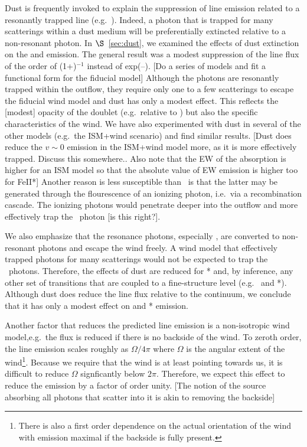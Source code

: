 \documentclass[12pt,preprint]{aastex}
\begin{document}
Dust is frequently invoked to explain the suppression of line emission
related to a resonantly trapped line (e.g.\ \lya).  Indeed, a photon
that is trapped for many scatterings within a dust medium will be
preferentially extincted relative to a non-resonant photon.  In
$\S$~\ref{sec:dust}, we examined the effects of dust extinction on the
 and  emission.  The general result was a modest
suppression of the line flux of the order of (1+\taud)$^{-1}$ instead of
exp(--\taud).   [Do a series of models and fit a functional form for
the fiducial model]  Although the  photons are resonantly
trapped within the outflow, they require only one to a few scatterings
to escape the fiducial wind model and dust has only a
modest effect.  This reflects the [modest] opacity of the 
doublet (e.g.\ relative to \lya) but also the specific characteristics
of the wind.  We have also experimented with dust in several of the
other models (e.g.\ the ISM+wind scenario) and find similar results.
[Dust does reduce the $v \sim 0$ emission in the ISM+wind model more,
as it is more effectively trapped.  Discuss this somewhere..  Also
note that the EW of the absorption is higher for an ISM model so that
the absolute value of EW emission is higher too for FeII*]
Another reason  is less susceptible than \lya\ is that the
latter may be generated through the flourescence of an ionizing
photon, i.e.\ via a recombination cascade.  The ionizing photons 
would penetrate deeper into the outflow and more effectively trap the
\lya\ photon [is this right?].  

We also emphasize that the  resonance photons, especially
\feiia, are converted to non-resonant photons and escape the wind
freely.  A wind model that effectively trapped 
photons for many scatterings would not be expected to trap the
\feiid\ photons.  Therefore, the effects of dust are 
reduced for * and, by inference, any other set of
transitions that are coupled to a fine-structure level (e.g.\
 and *).  
Although dust does reduce the line flux relative to the continuum, we
conclude that it has only a modest effect on \ion{Mg}{2} and
* emission.    

Another factor that reduces the predicted line emission is a
non-isotropic wind model,e.g.\ the flux is reduced if there is no
backside of the wind.  To zeroth order, the line emission scales
roughly as $\Omega/4\pi$ where $\Omega$ is the angular extent of the
wind\footnote{There is also a first order dependence on the actual
  orientation of the wind with emission maximal if the backside is
  fully present.}.  Because we require that the wind is at least
pointing towards us, it is difficult to reduce $\Omega$ signficantly
below $2 \pi$.  Therefore, we expect this effect to reduce the
emission by a factor of order unity.  
[The notion of the source absorbing all photons that scatter into it
is akin to removing the backside]
\end{document}
